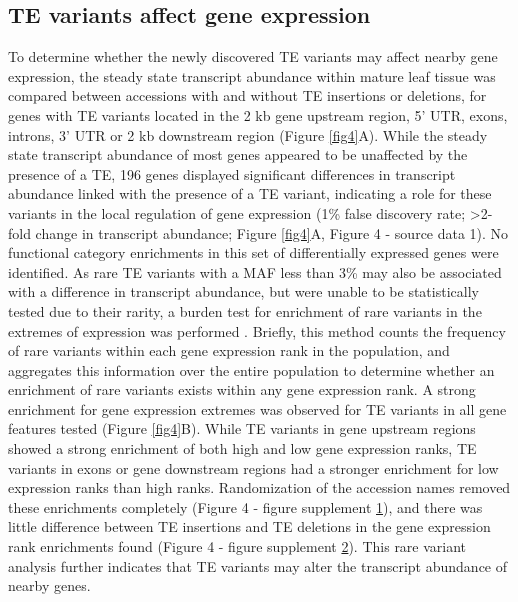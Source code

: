 \documentclass[12pt]{article}
\begin{document}
\subsection{TE variants affect gene expression}

To determine whether the newly discovered TE variants may affect
nearby gene expression, the steady state transcript abundance within
mature leaf tissue was compared between accessions with and without TE
insertions or deletions, for genes with TE variants located in the 2
kb gene upstream region, 5' UTR, exons, introns, 3' UTR or 2 kb
downstream region (Figure \ref{fig4}A). While the steady state
transcript abundance of most genes appeared to be unaffected by the
presence of a TE, 196 genes displayed significant differences in
transcript abundance linked with the presence of a TE variant,
indicating a role for these variants in the local regulation of gene
expression (1\% false discovery rate; \textgreater{}2-fold change in
transcript abundance; Figure \ref{fig4}A, Figure 4 - source data
1). No functional category enrichments in this set of differentially
expressed genes were identified. As rare TE variants with a MAF less
than 3\% may also be associated with a difference in transcript
abundance, but were unable to be statistically tested due to their
rarity, a burden test for enrichment of rare variants in the extremes
of expression was performed \cite{Zhao:2016gc}. Briefly, this method
counts the frequency of rare variants within each gene expression rank
in the population, and aggregates this information over the entire
population to determine whether an enrichment of rare variants exists
within any gene expression rank. A strong enrichment for gene
expression extremes was observed for TE variants in all gene features
tested (Figure \ref{fig4}B). While TE variants in gene upstream
regions showed a strong enrichment of both high and low gene
expression ranks, TE variants in exons or gene downstream regions had
a stronger enrichment for low expression ranks than high
ranks. Randomization of the accession names removed these enrichments
completely (Figure 4 - figure supplement \hyperref[fig4s1]{1}), and
there was little difference between TE insertions and TE deletions in
the gene expression rank enrichments found (Figure 4 - figure
supplement \hyperref[fig4s2]{2}). This rare variant analysis further
indicates that TE variants may alter the transcript abundance of
nearby genes.
\end{document}

